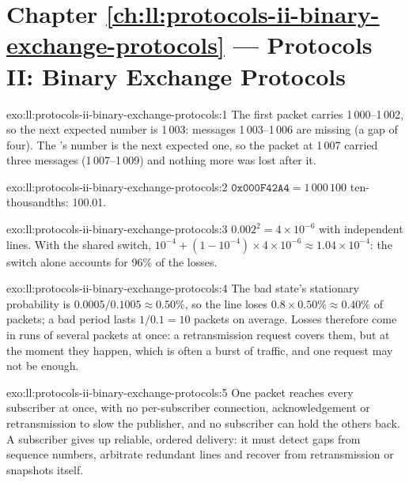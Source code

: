 \section*{Chapter \ref{ch:ll:protocols-ii-binary-exchange-protocols} --- Protocols II: Binary Exchange Protocols}

\begin{solution}{exo:ll:protocols-ii-binary-exchange-protocols:1}
The first packet carries 1\,000--1\,002, so the next expected number is 1\,003: messages 1\,003--1\,006 are missing (a gap of
four). The 's number is the next expected one, so the packet at 1\,007 carried three messages (1\,007--1\,009) and
nothing more was lost after it.
\end{solution}

\begin{solution}{exo:ll:protocols-ii-binary-exchange-protocols:2}
$\mathtt{0x000F42A4} = 1\,000\,100$ ten-thousandths: 100.01.
\end{solution}

\begin{solution}{exo:ll:protocols-ii-binary-exchange-protocols:3}
$0.002^2 = 4 \times 10^{-6}$ with independent lines. With the shared switch, $10^{-4} + (1 - 10^{-4}) \times 4 \times 10^{-6}
\approx 1.04 \times 10^{-4}$: the switch alone accounts for 96\% of the losses.
\end{solution}

\begin{solution}{exo:ll:protocols-ii-binary-exchange-protocols:4}
The bad state's stationary probability is $0.0005/0.1005 \approx 0.50\%$, so the line loses $0.8 \times 0.50\% \approx 0.40\%$
of packets; a bad period lasts $1/0.1 = 10$ packets on average. Losses therefore come in runs of several packets at once: a
retransmission request covers them, but at the moment they happen, which is often a burst of traffic, and one request may not
be enough.
\end{solution}

\begin{solution}{exo:ll:protocols-ii-binary-exchange-protocols:5}
One  packet reaches every subscriber at once, with no per-subscriber connection, acknowledgement or retransmission to
slow the publisher, and no subscriber can hold the others back. A subscriber gives up reliable, ordered delivery: it must
detect gaps from sequence numbers, arbitrate redundant lines and recover from retransmission or snapshots itself.
\end{solution}

